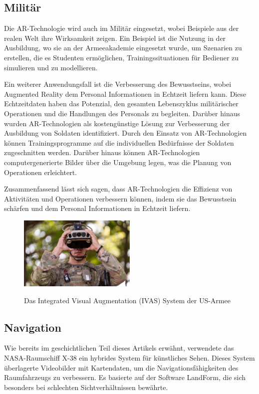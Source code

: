\newpage

\subsection{Militär}
Die AR-Technologie wird auch im Militär eingesetzt, wobei Beispiele aus der realen Welt ihre Wirksamkeit zeigen. Ein Beispiel ist die Nutzung in der Ausbildung, wo sie an der Armeeakademie eingesetzt wurde, um Szenarien zu erstellen, die es Studenten ermöglichen, Trainingssituationen für Bediener zu simulieren und zu modellieren. \cite{Virca2021ApplicationsOA}

Ein weiterer Anwendungsfall ist die Verbesserung des Bewusstseins, wobei Augmented Reality dem Personal Informationen in Echtzeit liefern kann. Diese Echtzeitdaten haben das Potenzial, den gesamten Lebenszyklus militärischer Operationen und die Handlungen des Personals zu begleiten. Darüber hinaus wurden AR-Technologien als kostengünstige Lösung zur Verbesserung der Ausbildung von Soldaten identifiziert. Durch den Einsatz von AR-Technologien können Trainingsprogramme auf die individuellen Bedürfnisse der Soldaten zugeschnitten werden. Darüber hinaus können AR-Technologien computergenerierte Bilder über die Umgebung legen, was die Planung von Operationen erleichtert. \cite{Virca2021ApplicationsOA}

Zusammenfassend lässt sich sagen, dass AR-Technologien die Effizienz von Aktivitäten und Operationen verbessern können, indem sie das Bewusstsein schärfen und dem Personal Informationen in Echtzeit liefern. \cite{Virca2021ApplicationsOA}


\begin{figure}[h!]
    \centering
    \includegraphics[width=0.5\textwidth]{attachments/army.jpeg}
    \caption{Das Integrated Visual Augmentation (IVAS) System der US-Armee} \cite{Soldier_IVAS}
\end{figure}

\subsection{Navigation}
Wie bereits im geschichtlichen Teil dieses Artikels erwähnt, verwendete das NASA-Raumschiff X-38 ein hybrides System für künstliches Sehen. Dieses System überlagerte Videobilder mit Kartendaten, um die Navigationsfähigkeiten des Raumfahrzeugs zu verbessern. Es basierte auf der Software LandForm, die sich besonders bei schlechten Sichtverhältnissen bewährte. \cite{Delgado2001HybridSS}

